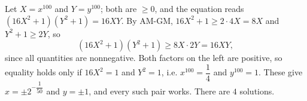 Let $X=x^{100}$ and $Y=y^{100}$; both are $\ge0$, and the equation reads $\left(16X^2+1\right)\left(Y^2+1\right)=16XY$. By AM-GM, $16X^2+1\ge2\cdot4X=8X$ and $Y^2+1\ge2Y$, so
\[\left(16X^2+1\right)\left(Y^2+1\right)\ge8X\cdot2Y=16XY,\]
since all quantities are nonnegative. Both factors on the left are positive, so equality holds only if $16X^2=1$ and $Y^2=1$, i.e. $x^{100}=\dfrac14$ and $y^{100}=1$. These give $x=\pm2^{-\dfrac1{50}}$ and $y=\pm1$, and every such pair works. There are $\boxed{4}$ solutions.
